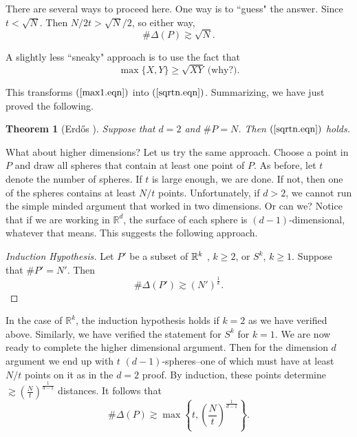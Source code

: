 \documentclass[]{amsart}
\numberwithin{equation}{section}
\theoremstyle{plain}
\newtheorem{theorem}{Theorem}[section]
\theoremstyle{definition}
\theoremstyle{remark}
\begin{document}
There are several ways to proceed here. One way is to ``guess" the
answer. Since $t<\sqrt{N}$. Then $N/2t>\sqrt{N}/2$, so
either way,
\begin{equation} \label{sqrtn.eqn}
\# \Delta(P) \gtrsim \sqrt{N}.
\end{equation}


A slightly less ``sneaky" approach is to use the fact that
\begin{equation}
\max \{X,Y\} \ge \sqrt{XY} \  \text{(why?)}.
\end{equation}


This transforms $(\ref{max1.eqn})$ into $(\ref{sqrtn.eqn})$. Summarizing, we have just
proved the following.

\begin{theorem}[Erd\H{o}s \cite{Erd}] \label{erdos.thm}
Suppose that $d=2$ and $\# P=N$. Then
$(\ref{sqrtn.eqn})$ holds. \end{theorem}

What about higher dimensions? Let us try the same approach. Choose
a point in $P$ and draw all spheres that contain at least one
point of $P$. As before, let $t$ denote the number of spheres. If
$t$ is large enough, we are done. If not, then one of the spheres
contains at least $N/t$ points. Unfortunately, if $d>2$, we cannot
run the simple minded argument that worked in two dimensions. Or
can we? Notice that if we are working in $\mathbb{R}^d$, the surface
of each sphere is $(d-1)$-dimensional, whatever that means. This
suggests the following approach.

\begin{proof}[Induction Hypothesis] Let $P'$ be a subset of ${\Bbb
R}^k$ , $k \ge 2$, or $S^{k}$, $k \ge 1$. Suppose that $\# P'=N'$.
Then
$$ \# \Delta(P') \gtrsim {(N')}^{\frac{1}{k}}. $$ \end{proof}

In the case of $\mathbb{R}^k$, the induction hypothesis holds if
$k=2$ as we have verified above. Similarly, we have verified the
statement for $S^k$ for $k=1$. We are now ready to complete the
higher dimensional argument.  Then for the dimension $d$ argument
we end up with $t$ $(d-1)$-spheres--one of which must have at
least $N/t$ points on it as in the $d=2$ proof. By induction,
these points determine $\gtrsim
{\left(\frac{N}{t}\right)}^{\frac{1}{d-1}}$ distances. It follows
that
\begin{equation}
\# \Delta(P) \gtrsim \max \left\{t,
{\left(\frac{N}{t}\right)}^{\frac{1}{d-1}} \right\}.
\end{equation}
\end{document}
